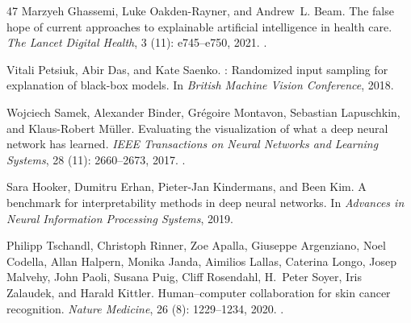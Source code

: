 \documentclass[11pt]{article}
\begin{document}
\begin{thebibliography}{47}
Marzyeh Ghassemi, Luke Oakden-Rayner, and Andrew~L. Beam.
\newblock The false hope of current approaches to explainable artificial
  intelligence in health care.
\newblock \emph{The Lancet Digital Health}, 3 (11):
  e745--e750, 2021.
\newblock {}.

Vitali Petsiuk, Abir Das, and Kate Saenko.
: Randomized input sampling for explanation of black-box
  models.
\newblock In \emph{British Machine Vision Conference}, 2018.

Wojciech Samek, Alexander Binder, Gr{\'e}goire Montavon, Sebastian Lapuschkin,
  and Klaus-Robert M{\"u}ller.
\newblock Evaluating the visualization of what a deep neural network has
  learned.
\newblock \emph{IEEE Transactions on Neural Networks and Learning Systems},
  28 (11): 2660--2673, 2017.
\newblock {}.

Sara Hooker, Dumitru Erhan, Pieter-Jan Kindermans, and Been Kim.
\newblock A benchmark for interpretability methods in deep neural networks.
\newblock In \emph{Advances in Neural Information Processing Systems}, 2019.

Philipp Tschandl, Christoph Rinner, Zoe Apalla, Giuseppe Argenziano, Noel
  Codella, Allan Halpern, Monika Janda, Aimilios Lallas, Caterina Longo, Josep
  Malvehy, John Paoli, Susana Puig, Cliff Rosendahl, H.~Peter Soyer, Iris
  Zalaudek, and Harald Kittler.
\newblock Human--computer collaboration for skin cancer recognition.
\newblock \emph{Nature Medicine}, 26 (8): 1229--1234, 2020.
\newblock {}.

\end{thebibliography}
\end{document}
